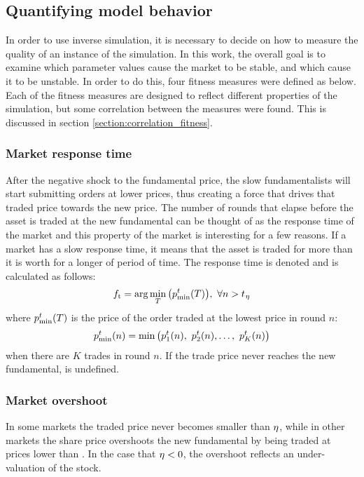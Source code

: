 \subsection{Quantifying model behavior}\label{section:simulation_fitness}
In order to use inverse simulation, it is necessary to decide on how to measure the quality of an instance of the simulation. In this work, the overall goal is to examine which parameter values cause the market to be stable, and which cause it to be unstable. In order to do this, four fitness measures were defined as below. Each of the fitness measures are designed to reflect different properties of the simulation, but some correlation between the measures were found. This is discussed in section \ref{section:correlation_fitness}.
\subsubsection{Market response time}
After the negative shock to the fundamental price, the slow fundamentalists will start submitting orders at lower prices, thus creating a force that drives that traded price towards the new price. The number of rounds that elapse before the asset is traded at the new fundamental  can be thought of as the response time of the market and this property of the market is interesting for a few reasons. If a market has a slow response time, it means that the asset is traded for more than it is worth for a longer of period of time. The response time is denoted \timetoreachnewfundamental{} and is calculated as follows:
\begin{equation}\label{eq:timetoreachnewfundamental}
f_\text{t} = \arg\min_T \big( p^t_{\min}(T)\big),\ \forall n > t_{}{_\eta}
\end{equation}
where $p^t_{\min}(T)$ is the price of the order traded at the lowest price in round $n$:
\begin{equation}
\tradeprice{n}{\min} = \min \big(\tradeprice{n}{1},\ \tradeprice{n}{2}, \hdots,\ \tradeprice{n}{K}\big)
\end{equation}
when there are $K$ trades in round $n$. If the trade price never reaches the new fundamental, \timetoreachnewfundamental{} is undefined.

\subsubsection{Market overshoot}
In some markets the traded price never becomes smaller than $\eta$, while in other markets the share price overshoots the new fundamental by being traded at prices lower than \fundamentalaftershock. In the case that $\eta < 0$, the overshoot reflects an under-valuation of the stock.

